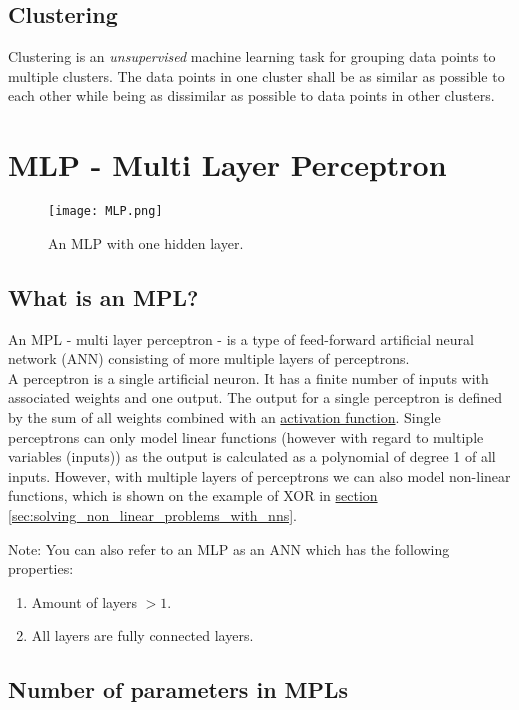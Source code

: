 \subsection{Clustering}

Clustering is an \textit{unsupervised} machine learning task for grouping data points to multiple clusters. The data points in one cluster shall be as similar as possible to each other while being as dissimilar as possible to data points in other clusters.

\section{MLP - Multi Layer Perceptron}

\begin{figure}[h]
    \centering
    \texttt{[image: MLP.png]}
    \caption{An MLP with one hidden layer.}
    \label{fig:mlp}
\end{figure}

\subsection{What is an MPL?}

An MPL - multi layer perceptron - is a type of feed-forward artificial neural network (ANN) consisting of more multiple layers of perceptrons.\\
A perceptron is a single artificial neuron. It has a finite number of inputs with associated weights and one output. The output for a single perceptron is defined by the sum of all weights combined with an \hyperref[sec:activation_functions]{activation function}. Single perceptrons can only model linear functions (however with regard to multiple variables (inputs)) as the output is calculated as a polynomial of degree 1 of all inputs. However, with multiple layers of perceptrons we can also model non-linear functions, which is shown on the example of XOR in \hyperref[sec:solving_non_linear_problems_with_nns]{section \ref*{sec:solving_non_linear_problems_with_nns}}.

Note: You can also refer to an MLP as an ANN which has the following properties:
\begin{enumerate}
    \item Amount of layers $> 1$.
    \item All layers are fully connected layers.
\end{enumerate}

\subsection{Number of parameters in MPLs}

